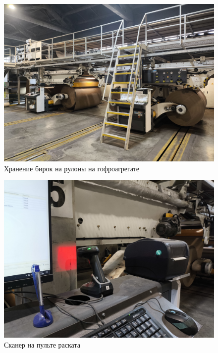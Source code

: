 \begin{figure}
\begin{center}
 \includegraphics[height=0.4\textheight, keepaspectratio]{Pics/V раскаты.jpg}
\end{center}
 \caption{Хранение бирок на рулоны на гофроагрегате}
 \label{pic:V раскаты}
\end{figure}

\begin{figure}
\begin{center}
 \includegraphics[height=0.4\textheight, keepaspectratio]{Pics/V Сканер на ГА.jpg}
\end{center}
 \caption{Сканер на пульте раската}
 \label{pic:V Сканер на ГА}
\end{figure}

